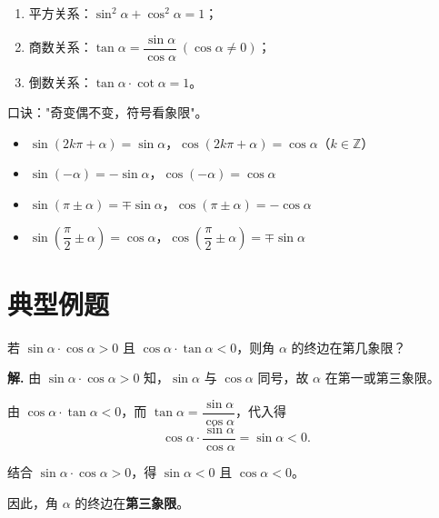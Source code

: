 \documentclass[11pt]{ctexrep}
\begin{document}
\begin{property}[同角三角比的基本关系]
    \begin{enumerate}
        \item 平方关系：$\sin^2\alpha + \cos^2\alpha = 1$；
        \item 商数关系：$\tan\alpha = \dfrac{\sin\alpha}{\cos\alpha}\ (\cos\alpha \neq 0)$；
        \item 倒数关系：$\tan\alpha \cdot \cot\alpha = 1$。
    \end{enumerate}
\end{property}

\begin{property}[诱导公式]
    口诀："奇变偶不变，符号看象限"。
    \begin{itemize}
        \item $\sin(2k\pi + \alpha) = \sin\alpha$，$\cos(2k\pi + \alpha) = \cos\alpha$（$k \in \mathbb{Z}$）
        \item $\sin(-\alpha) = -\sin\alpha$，$\cos(-\alpha) = \cos\alpha$
        \item $\sin(\pi \pm \alpha) = \mp\sin\alpha$，$\cos(\pi \pm \alpha) = -\cos\alpha$
        \item $\sin\left(\dfrac{\pi}{2} \pm \alpha\right) = \cos\alpha$，$\cos\left(\dfrac{\pi}{2} \pm \alpha\right) = \mp\sin\alpha$
    \end{itemize}
\end{property}

\section*{典型例题}

\begin{example}[三角比的符号判断]
    若 $\sin\alpha \cdot \cos\alpha > 0$ 且 $\cos\alpha \cdot \tan\alpha < 0$，则角 $\alpha$ 的终边在第几象限？
\end{example}

\textbf{解.} 由 $\sin\alpha \cdot \cos\alpha > 0$ 知，$\sin\alpha$ 与 $\cos\alpha$ 同号，故 $\alpha$ 在第一或第三象限。

由 $\cos\alpha \cdot \tan\alpha < 0$，而 $\tan\alpha = \dfrac{\sin\alpha}{\cos\alpha}$，代入得
\[
    \cos\alpha \cdot \frac{\sin\alpha}{\cos\alpha} = \sin\alpha < 0.
\]

结合 $\sin\alpha \cdot \cos\alpha > 0$，得 $\sin\alpha < 0$ 且 $\cos\alpha < 0$。

因此，角 $\alpha$ 的终边在\textbf{第三象限}。
\end{document}

